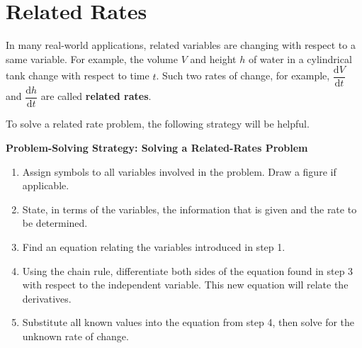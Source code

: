
\hypertarget{related-rates}{%
\section{Related Rates}\label{related-rates}}

In many real-world applications, related variables are changing with
respect to a same variable. For example, the volume \(V\) and height
\(h\) of water in a cylindrical tank change with respect to time \(t\).
Such two rates of change, for example,
\(\dfrac{\mathrm{d}V}{\mathrm{d}t}\) and
\(\dfrac{\mathrm{d}h}{\mathrm{d}t}\) are called \textbf{related rates}.

To solve a related rate problem, the following strategy will be helpful.

\textbf{Problem-Solving Strategy: Solving a Related-Rates Problem}

\begin{enumerate}[sepno]
\item
  Assign symbols to all variables involved in the problem. Draw a figure
  if applicable.
\item
  State, in terms of the variables, the information that is given and
  the rate to be determined.
\item
  Find an equation relating the variables introduced in step 1.
\item
  Using the chain rule, differentiate both sides of the equation found
  in step 3 with respect to the independent variable. This new equation
  will relate the derivatives.
\item
  Substitute all known values into the equation from step 4, then solve
  for the unknown rate of change.
\end{enumerate}

